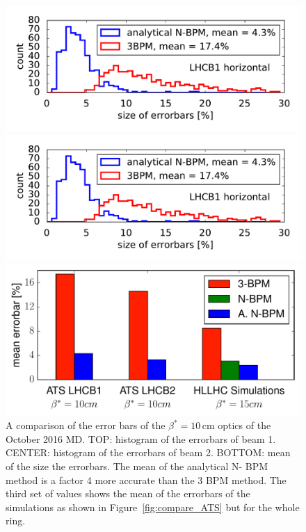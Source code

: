 \begin{figure}
	\centering
	\includegraphics[width=\linewidth]{comparison_errorbars_Beam1}
	
	\includegraphics[width=\linewidth]{comparison_errorbars_Beam2}
	
	\includegraphics[width=\linewidth]{mean_errorbars}
	
	\caption{A comparison of the error bars of the $ \beta^*=10\,\text{cm} $ optics of the October 2016 MD. TOP: histogram of the errorbars of beam 1. CENTER: histogram of the errorbars of beam 2. BOTTOM: mean of the size the errorbars. The mean of the analytical N- BPM method is a factor 4 more accurate than the 3 BPM method. The third set of values shows the mean of the errorbars of the simulations as shown in Figure~\ref{fig:compare_ATS} but for the whole ring.}
	\label{fig:HL_report/comparison_errorbars}
\end{figure}
